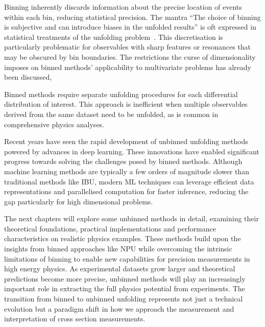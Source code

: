    Binning inherently discards information about the precise location of events within each bin, reducing statistical precision.
    The mantra ``The choice of binning is subjective and can introduce biases in the unfolded results'' is oft expressed in statistical treatments of the unfolding problem~\cite{cowan_survey_2002, cowan_statistics_2021, CowanStatisticalRehovot, Cowan2011AsymptoticPhysics,Tang2017DataMethod, hocker_svd_1996, Gagunashvili2024DataOptimization, CranmerPracticalLHC, StatisticalPhysics, Bohm2025IntroductionPhysicists, gardi_statistics_2015, Adam-Bourdarios2015TheChallenge, cowan_topics_2010}.
    This discretisation is particularly problematic for observables with sharp features or resonances that may be obscured by bin boundaries.
    The restrictions the curse of dimensionality imposes on binned methods' applicability to multivariate problems has already been discussed, 

    Binned methods require separate unfolding procedures for each differential distribution of interest.
    This approach is inefficient when multiple observables derived from the same dataset need to be unfolded, as is common in comprehensive physics analyses.
    
    Recent years have seen the rapid development of unbinned unfolding methods powered by advances in deep learning.
    These innovations have enabled significant progress towards solving the challenges posed by binned methods.
    Although machine learning methods are typically a few orders of magnitude slower than traditional methods like IBU, modern ML techniques can leverage efficient data representations and parallelised computation for faster inference, reducing the gap particularly for high dimensional problems.

    The next chapters will explore some unbinned methods in detail, examining their theoretical foundations, practical implementations and performance characteristics on realistic physics examples.
    These methods build upon the insights from binned approaches like NPU while overcoming the intrinsic limitations of binning to enable new capabilities for precision measurements in high energy physics.
    As experimental datasets grow larger and theoretical predictions become more precise, unbinned methods will play an increasingly important role in extracting the full physics potential from experiments.
    The transition from binned to unbinned unfolding represents not just a technical evolution but a paradigm shift in how we approach the measurement and interpretation of cross section measurements.
